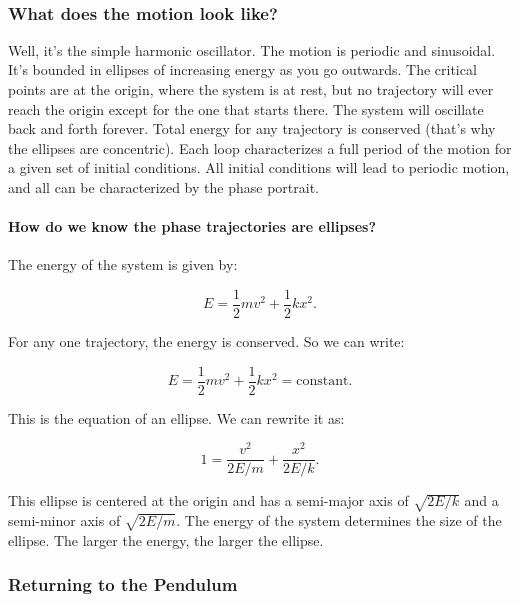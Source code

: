 \documentclass[11pt]{article}
\begin{document}
    \begin{center}
    \end{center}
    { \hspace*{\fill} \\}
    
    \subsubsection{What does the motion look
like?}\label{what-does-the-motion-look-like}

Well, it's the simple harmonic oscillator. The motion is periodic and
sinusoidal. It's bounded in ellipses of increasing energy as you go
outwards. The critical points are at the origin, where the system is at
rest, but no trajectory will ever reach the origin except for the one
that starts there. The system will oscillate back and forth forever.
Total energy for any trajectory is conserved (that's why the ellipses
are concentric). Each loop characterizes a full period of the motion for
a given set of initial conditions. All initial conditions will lead to
periodic motion, and all can be characterized by the phase portrait.

\paragraph{How do we know the phase trajectories are
ellipses?}\label{how-do-we-know-the-phase-trajectories-are-ellipses}

The energy of the system is given by:

\[E = \dfrac{1}{2}mv^2 + \dfrac{1}{2}kx^2.\]

For any one trajectory, the energy is conserved. So we can write:

\[E = \dfrac{1}{2}mv^2 + \dfrac{1}{2}kx^2 = \text{constant}.\]

This is the equation of an ellipse. We can rewrite it as:

\[1 = \dfrac{v^2}{2E/m} + \dfrac{x^2}{2E/k}.\]

This ellipse is centered at the origin and has a semi-major axis of
\(\sqrt{2E/k}\) and a semi-minor axis of \(\sqrt{2E/m}\). The energy of
the system determines the size of the ellipse. The larger the energy,
the larger the ellipse.

    \subsubsection{Returning to the
Pendulum}\label{returning-to-the-pendulum}
\end{document}
